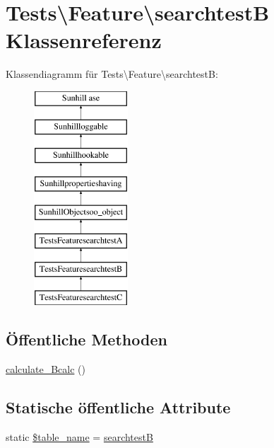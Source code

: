 \hypertarget{classTests_1_1Feature_1_1searchtestB}{}\section{Tests\textbackslash{}Feature\textbackslash{}searchtestB Klassenreferenz}
\label{classTests_1_1Feature_1_1searchtestB}
Klassendiagramm für Tests\textbackslash{}Feature\textbackslash{}searchtestB\+:\begin{figure}[H]
\begin{center}
\leavevmode
\includegraphics[height=8.000000cm]{de/d01/classTests_1_1Feature_1_1searchtestB}
\end{center}
\end{figure}
\subsection*{Öffentliche Methoden}
\begin{DoxyCompactItemize}
\item 
\hyperlink{classTests_1_1Feature_1_1searchtestB_a0fc78426cd59ec589fcbbf1b0a8420f2}{calculate\+\_\+\+Bcalc} ()
\end{DoxyCompactItemize}
\subsection*{Statische öffentliche Attribute}
\begin{DoxyCompactItemize}
\item 
static \hyperlink{classTests_1_1Feature_1_1searchtestB_a681d813b810e7c6b3a0e03a801e5c1b5}{\$table\+\_\+name} = \textquotesingle{}\hyperlink{classTests_1_1Feature_1_1searchtestB}{searchtestB}\textquotesingle{}
\end{DoxyCompactItemize}
